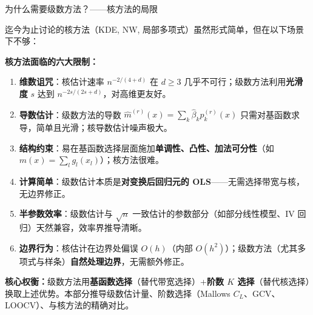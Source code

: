 \documentclass[aspectratio=169, 10pt]{beamer}
\begin{document}
\begin{frame}[shrink=8]{为什么需要级数方法？——核方法的局限}

  迄今为止讨论的核方法（KDE, NW, 局部多项式）虽然形式简单，但在以下场景下不够：

  \begin{highlightbox}
    \textbf{核方法面临的六大限制：}
    \begin{enumerate}\setlength{\itemsep}{2pt}
      \item \textbf{维数诅咒}：核估计速率 $n^{-2/(4+d)}$ 在 $d \geq 3$ 几乎不可行；级数方法利用\textbf{光滑度} $s$ 达到 $n^{-2s/(2s+d)}$，对高维更友好。
      \item \textbf{导数估计}：级数方法的导数 $\hat m^{(r)}(x) = \sum_k \hat\beta_k p_k^{(r)}(x)$ 只需对基函数求导，简单且光滑；核导数估计噪声极大。
      \item \textbf{结构约束}：易在基函数选择层面施加\textbf{单调性、凸性、加法可分性}（如 $m(x) = \sum_l g_l(x_l)$）；核方法很难。
      \item \textbf{计算简单}：级数估计本质是\textbf{对变换后回归元的 OLS}——无需选择带宽与核，无边界修正。
      \item \textbf{半参数效率}：级数估计与 $\sqrt{n}$ 一致估计的参数部分（如部分线性模型、IV 回归）天然兼容，效率界推导清晰。
      \item \textbf{边界行为}：核估计在边界处偏误 $O(h)$（内部 $O(h^2)$）；级数方法（尤其多项式与样条）\textbf{自然处理边界}，无需额外修正。
    \end{enumerate}
  \end{highlightbox}

  \begin{keybox}
    \textbf{核心权衡：}级数方法用\textbf{基函数选择}（替代带宽选择）+\textbf{阶数 $K$ 选择}（替代核选择）换取上述优势。本部分推导级数估计量、阶数选择（Mallows $C_L$、GCV、LOOCV）、与核方法的精确对比。
  \end{keybox}

\end{frame}
\end{document}
